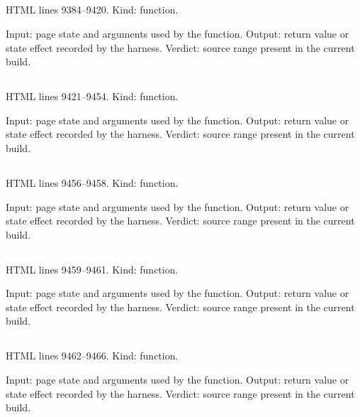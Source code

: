 \subsection*{\texttt{}}
\label{vf_512_reviewControlSeries}
HTML lines 9384--9420. Kind: function.

Input: page state and arguments used by the function.
Output: return value or state effect recorded by the harness.
Verdict: source range present in the current build.

\subsection*{\texttt{}}
\label{vf_513_instrumentRecordTables}
HTML lines 9421--9454. Kind: function.

Input: page state and arguments used by the function.
Output: return value or state effect recorded by the harness.
Verdict: source range present in the current build.

\subsection*{\texttt{}}
\label{vf_514_emptyReview}
HTML lines 9456--9458. Kind: function.

Input: page state and arguments used by the function.
Output: return value or state effect recorded by the harness.
Verdict: source range present in the current build.

\subsection*{\texttt{}}
\label{vf_515_metricCard}
HTML lines 9459--9461. Kind: function.

Input: page state and arguments used by the function.
Output: return value or state effect recorded by the harness.
Verdict: source range present in the current build.

\subsection*{\texttt{}}
\label{vf_516_downloadCanvas}
HTML lines 9462--9466. Kind: function.

Input: page state and arguments used by the function.
Output: return value or state effect recorded by the harness.
Verdict: source range present in the current build.

